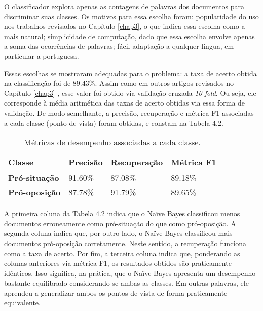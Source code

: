 O classificador explora apenas as contagens de palavras dos documentos para discriminar suas classes. Os motivos para essa escolha foram: popularidade do uso nos trabalhos revisados no Capítulo \ref{chap3}, o que indica essa escolha como a mais natural; simplicidade de computação, dado que essa escolha envolve apenas a soma das ocorrências de palavras; fácil adaptação a qualquer língua, em particular a portuguesa. 


Essas escolhas se mostraram adequadas para o problema: a taxa de acerto obtida na classificação foi de 89.43\%. Assim como em outros artigos revisados no Capítulo \ref{chap3} \cite{lin-et-al2006, aaai-politics, klebanov}, esse valor foi obtido via validação cruzada \emph{10-fold}. Ou seja, ele corresponde à média aritmética das taxas de acerto obtidas via essa forma de validação. De modo semelhante, a precisão, recuperação e métrica F1  associadas a cada classe (ponto de vista) foram obtidas, e constam na Tabela 4.2. %


\begin{table}[h]
\centering
\begin{tabular}{| l | l | l | l | }
\hline

\textbf{Classe} & \textbf{Precisão} & \textbf{Recuperação} & \textbf{Métrica F1} \\ \hline

\textbf{Pró-situação} & 91.60\% & 87.08\% & 89.18\% \\ \hline
\textbf{Pró-oposição} & 87.78\% & 91.79\% & 89.65\% \\ \hline
\end{tabular}
\label{resultados}
\caption{Métricas de desempenho associadas a cada classe.}
\end{table}

A primeira coluna da Tabela 4.2 indica que o Naïve Bayes classificou menos documentos erroneamente como pró-situação do que como pró-oposição. A segunda coluna indica que, por outro lado, o Naïve Bayes classificou mais documentos pró-oposição corretamente. Neste sentido, a recuperação funciona como a taxa de acerto. Por fim, a terceira coluna indica que, ponderando as colunas anteriores via métrica F1, os resultados obtidos são praticamente idênticos. Isso significa, na prática, que o Naïve Bayes apresenta um desempenho bastante equilibrado considerando-se ambas as classes. Em outras palavras, ele aprendeu a generalizar ambos os pontos de vista de forma praticamente equivalente. 

